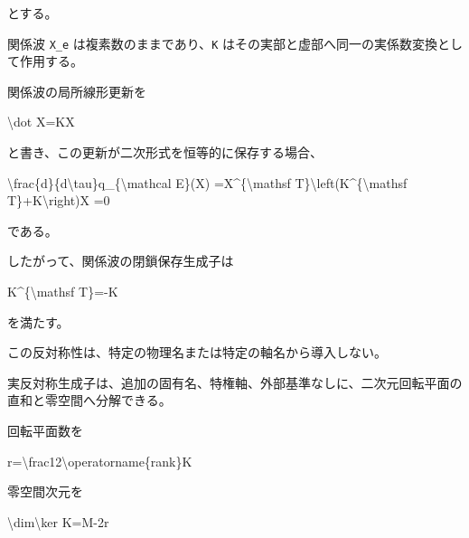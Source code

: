\documentclass[
  a4paper,
]{ltjsarticle}
\newenvironment{Shaded}{}{}
\newcommand{\NormalTok}[1]{#1}
\begin{document}
とする。

関係波 \texttt{X\_e} は複素数のままであり、\texttt{K}
はその実部と虚部へ同一の実係数変換として作用する。

関係波の局所線形更新を

\begin{Shaded}
\begin{Highlighting}[]
\NormalTok{\textbackslash{}dot X=KX}
\end{Highlighting}
\end{Shaded}

と書き、この更新が二次形式を恒等的に保存する場合、

\begin{Shaded}
\begin{Highlighting}[]
\NormalTok{\textbackslash{}frac\{d\}\{d\textbackslash{}tau\}q\_\{\textbackslash{}mathcal E\}(X)}
\NormalTok{=X\^{}\{\textbackslash{}mathsf T\}\textbackslash{}left(K\^{}\{\textbackslash{}mathsf T\}+K\textbackslash{}right)X}
\NormalTok{=0}
\end{Highlighting}
\end{Shaded}

である。

したがって、関係波の閉鎖保存生成子は

\begin{Shaded}
\begin{Highlighting}[]
\NormalTok{K\^{}\{\textbackslash{}mathsf T\}={-}K}
\end{Highlighting}
\end{Shaded}

を満たす。

この反対称性は、特定の物理名または特定の軸名から導入しない。

実反対称生成子は、追加の固有名、特権軸、外部基準なしに、二次元回転平面の直和と零空間へ分解できる。

回転平面数を

\begin{Shaded}
\begin{Highlighting}[]
\NormalTok{r=\textbackslash{}frac12\textbackslash{}operatorname\{rank\}K}
\end{Highlighting}
\end{Shaded}

零空間次元を

\begin{Shaded}
\begin{Highlighting}[]
\NormalTok{\textbackslash{}dim\textbackslash{}ker K=M{-}2r}
\end{Highlighting}
\end{Shaded}
\end{document}
